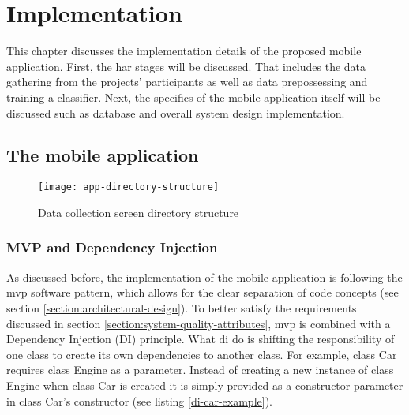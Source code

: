 \chapter{Implementation}
This chapter discusses the implementation details of the proposed mobile application. First, the \gls{har} stages will be discussed. That includes the data gathering from the projects' participants as well as data prepossessing and training a classifier. Next, the specifics of the mobile application itself will be discussed such as database and overall system design implementation.

\section{The mobile application}
      
    \begin{wrapfigure}{RI}{0.3\textwidth}
        \begin{center}
            \texttt{[image: app-directory-structure]}
        \end{center}
    \caption{Data collection screen directory structure}
    \label{fig:app-directory-structure}
    \end{wrapfigure}
    
    \subsection{MVP and Dependency Injection}
    As discussed before, the implementation of the mobile application is following the \gls{mvp} software pattern, which allows for the clear separation of code concepts (see section \ref{section:architectural-design}). To better satisfy the requirements discussed in section \ref{section:system-quality-attributes}, \gls{mvp} is combined with a Dependency Injection (DI) principle. What \gls{di} do is shifting the responsibility of one class to create its own dependencies to another class. For example, class Car requires class Engine as a parameter. Instead of creating a new instance of class Engine when class Car is created it is simply provided as a constructor parameter in class Car's constructor (see listing \ref{di-car-example}).
    
